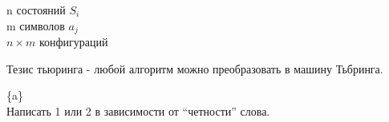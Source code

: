 \begin{example}
  n состояний $S_i$ \\
  m символов $a_j$ \\
  $n \times m$ конфигураций
\end{example}

\begin{definition}
  Тезис тьюринга - любой алгоритм можно преобразовать в машину Тьбринга.
\end{definition}

\begin{example}
  \{a\} \\
  Написать 1 или 2 в зависимости от ``четности'' слова. \\
\end{example}
